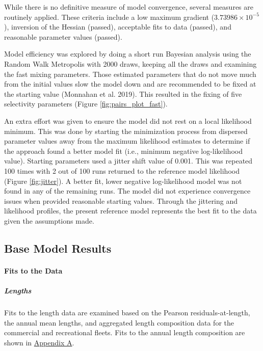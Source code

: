 \documentclass[11pt,
  english,
  letterpaper,
]{article}
\begin{document}
While there is no definitive measure of model convergence, several measures are routinely applied. These criteria include a low maximum gradient (\ensuremath{3.73986\times 10^{-5}}), inversion of the Hessian (passed), acceptable fits to data (passed), and reasonable parameter values (passed).

Model efficiency was explored by doing a short run Bayesian analysis using the Random Walk Metropolis with 2000 draws, keeping all the draws and examining the fast mixing parameters. Those estimated parameters that do not move much from the initial values slow the model down and are recommended to be fixed at the starting value (Monnahan et al. 2019). This resulted in the fixing of five selectivity parameters (Figure \ref{fig:pairs_plot_fast}).

An extra effort was given to ensure the model did not rest on a local likelihood minimum. This was done by starting the minimization process from dispersed parameter values away from the maximum likelihood estimates to determine if the approach found a better model fit (i.e., minimum negative log-likelihood value). Starting parameters used a jitter shift value of 0.001. This was repeated 100 times with 2 out of 100 runs returned to the reference model likelihood (Figure \ref{fig:jitter}). A better fit, lower negative log-likelihood model was not found in any of the remaining runs. The model did not experience convergence issues when provided reasonable starting values. Through the jittering and likelihood profiles, the present reference model represents the best fit to the data given the assumptions made.

\hypertarget{base-model-results}{%
\subsection{Base Model Results}\label{base-model-results}}

\hypertarget{fits-to-the-data}{%
\paragraph{Fits to the Data}\label{fits-to-the-data}}

\hypertarget{lengths}{%
\subparagraph{Lengths}\label{lengths}}

Fits to the length data are examined based on the Pearson residuals-at-length, the annual mean lengths, and aggregated length composition data for the commercial and recreational fleets. Fits to the annual length composition are shown in \protect\hyperlink{app_a}{Appendix A}.
\end{document}
